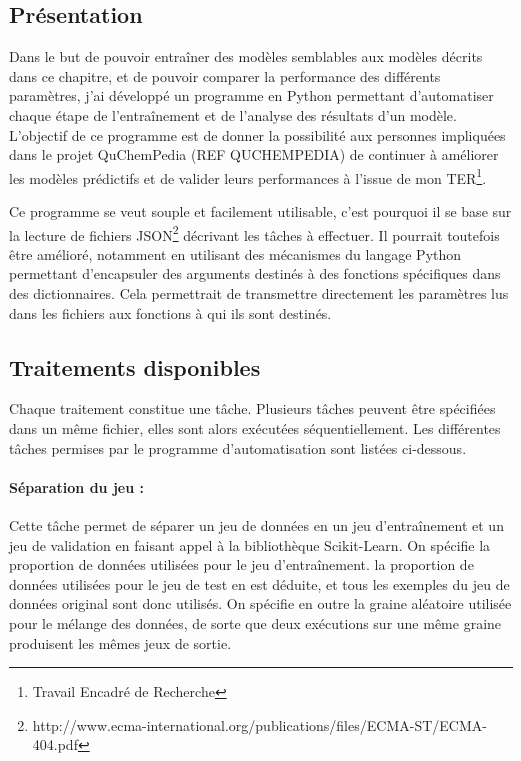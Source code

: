 \subsection{Présentation}
Dans le but de pouvoir entraîner des modèles semblables aux modèles décrits dans ce chapitre, et de pouvoir comparer la performance des différents paramètres, j'ai développé un programme en Python permettant d'automatiser chaque étape de l'entraînement et de l'analyse des résultats d'un modèle. L'objectif de ce programme est de donner la possibilité aux personnes impliquées dans le projet QuChemPedia (REF QUCHEMPEDIA) de continuer à améliorer les modèles prédictifs et de valider leurs performances à l'issue de mon TER\footnote{Travail Encadré de Recherche}.\\

\par Ce programme se veut souple et facilement utilisable, c'est pourquoi il se base sur la lecture de fichiers JSON\footnote{http://www.ecma-international.org/publications/files/ECMA-ST/ECMA-404.pdf} décrivant les tâches à effectuer. Il pourrait toutefois être amélioré, notamment en utilisant des mécanismes du langage Python permettant d'encapsuler des arguments destinés à des fonctions spécifiques dans des dictionnaires. Cela permettrait de transmettre directement les paramètres lus dans les fichiers aux fonctions à qui ils sont destinés.

\subsection{Traitements disponibles}

Chaque traitement constitue une tâche. Plusieurs tâches peuvent être spécifiées dans un même fichier, elles sont alors exécutées séquentiellement. Les différentes tâches permises par le programme d'automatisation sont listées ci-dessous.

\paragraph{Séparation du jeu : } Cette tâche permet de séparer un jeu de données en un jeu d'entraînement et un jeu de validation en faisant appel à la bibliothèque Scikit-Learn\cite{sklearn}. On spécifie la proportion de données utilisées pour le jeu d'entraînement. la proportion de données utilisées pour le jeu de test en est déduite, et tous les exemples du jeu de données original sont donc utilisés. On spécifie en outre la graine aléatoire utilisée pour le mélange des données, de sorte que deux exécutions sur une même graine produisent les mêmes jeux de sortie.


